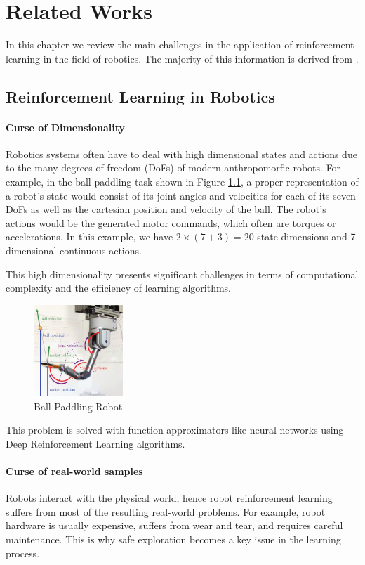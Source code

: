\chapter{Related Works}
In this chapter we review the main challenges in the application of reinforcement learning in the
field of robotics. The majority of this information is derived from \cite{Kober2013}.

\section{Reinforcement Learning in Robotics}

\subsubsection{Curse of Dimensionality}
Robotics systems often have to deal with high dimensional states and actions due to the many degrees of freedom (DoFs) of modern
anthropomorfic robots. For example, in the ball-paddling task shown in Figure \ref{fig:ball_paddling_robot}, a proper representation
of a robot's state would consist of its joint angles and velocities for each of its seven DoFs as well as the cartesian position
and velocity of the ball. The robot's actions would be the generated motor commands, which often are torques or accelerations.
In this example, we have $2\times\left(7 + 3\right)=20$ state dimensions and 7-dimensional continuous actions.

This high dimensionality presents significant challenges in terms of computational complexity 
and the efficiency of learning algorithms.

\begin{figure}[b]
    \centering
    \includegraphics[width=0.3\textwidth]{Images/ball_paddling.png}
    \caption{Ball Paddling Robot}
    \label{fig:ball_paddling_robot}
\end{figure}

This problem is solved with function approximators like neural networks using Deep Reinforcement Learning algorithms.

\subsubsection{Curse of real-world samples}
Robots interact with the physical world, hence robot reinforcement learning suffers from most of the resulting real-world problems.
For example, robot hardware is usually expensive, suffers from wear and tear, and requires careful maintenance. This is why safe exploration
becomes a key issue in the learning process.

